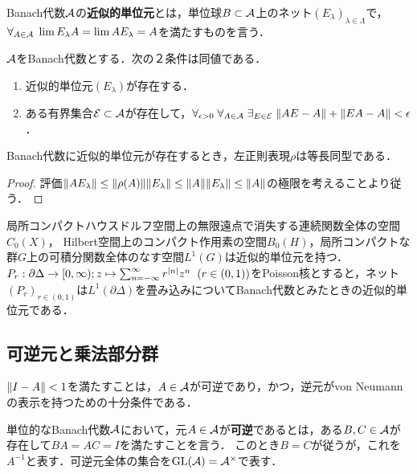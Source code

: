 \documentclass[uplatex,dvipdfmx]{jsreport}
\begin{document}
\begin{definition}
    Banach代数$\mathcal{A}$の\textbf{近似的単位元}とは，単位球$B\subset\mathcal{A}$上のネット$(E_\lambda)_{\lambda\in\Lambda}$で，$\forall_{A\in\mathcal{A}}\;\lim E_\lambda A=\lim AE_{\lambda}=A$を満たすものを言う．
\end{definition}
\begin{lemma}[近似的単位元の特徴付け]
    $\mathcal{A}$をBanach代数とする．次の２条件は同値である．
    \begin{enumerate}
        \item 近似的単位元$(E_\lambda)$が存在する．
        \item ある有界集合$\mathcal{E}\subset\mathcal{A}$が存在して，$\forall_{\epsilon>0}\;\forall_{A\in\mathcal{A}}\;\exists_{E\in\mathcal{E}}\;\|AE-A\|+\|EA-A\|<\epsilon$．
    \end{enumerate}
\end{lemma}
\begin{lemma}
    Banach代数に近似的単位元が存在するとき，左正則表現$\rho$は等長同型である．
\end{lemma}
\begin{proof}
    評価$\|AE_\lambda\|\le\|\rho(A)\|\|E_\lambda\|\le\|A\|\|E_\lambda\|\le\|A\|$の極限を考えることより従う．
\end{proof}
\begin{example}
    局所コンパクトハウスドルフ空間上の無限遠点で消失する連続関数全体の空間$C_0(X)$，
    Hilbert空間上のコンパクト作用素の空間$B_0(H)$，局所コンパクトな群$G$上の可積分関数全体のなす空間$L^1(G)$は近似的単位元を持つ．
    $P_r:\partial\Delta\to[0,\infty);z\mapsto\sum^\infty_{n=-\infty}r^{\lvert n\rvert}z^n\;\;(r\in(0,1))$をPoisson核とすると，ネット$(P_r)_{r\in(0,1)}$は$L^1(\partial\Delta)$を畳み込みについてBanach代数とみたときの近似的単位元である．
\end{example}

\subsection{可逆元と乗法部分群}

\begin{tcolorbox}[colframe=ForestGreen, colback=ForestGreen!10!white,breakable,colbacktitle=ForestGreen!40!white,coltitle=black,fonttitle=\bfseries\sffamily,
title=]
    $\|I-A\|<1$を満たすことは，$A\in\mathcal{A}$が可逆であり，かつ，逆元がvon Neumannの表示を持つための十分条件である．
\end{tcolorbox}

\begin{definition}[invertible]
    単位的なBanach代数$\mathcal{A}$において，元$A\in\mathcal{A}$が\textbf{可逆}であるとは，ある$B,C\in\mathcal{A}$が存在して$BA=AC=I$を満たすことを言う．
    このとき$B=C$が従うが，これを$A^{-1}$と表す．可逆元全体の集合を$\mathrm{GL}(\mathcal{A})=\mathcal{A}^\times$で表す．
\end{definition}
\end{document}
